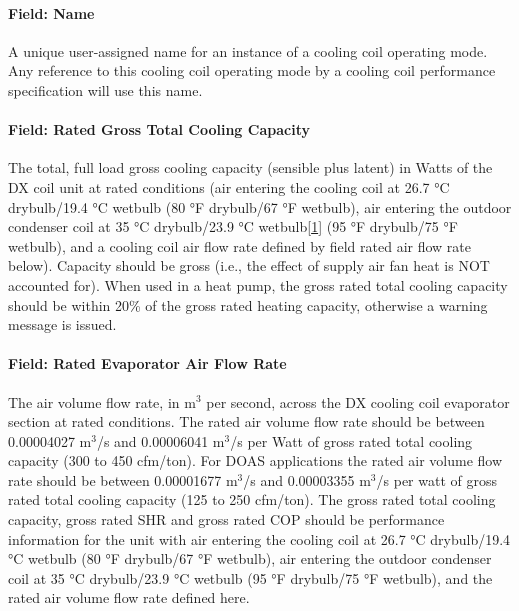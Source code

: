 \paragraph{Field: Name}\label{field-name-03}

A unique user-assigned name for an instance of a cooling coil operating mode. Any reference to this cooling coil operating mode by a cooling coil performance specification will use this name.

\paragraph{Field: Rated Gross Total Cooling Capacity}\label{field-rated-gross-total-cooling-capacity-1}

The total, full load gross cooling capacity (sensible plus latent) in Watts of the DX coil unit at rated conditions (air entering the cooling coil at 26.7 °C drybulb/19.4 °C wetbulb (80 °F drybulb/67 °F wetbulb), air entering the outdoor condenser coil at 35 °C drybulb/23.9 °C wetbulb\protect\hyperlink{ux5fftn1}{{[}1{]}} (95 °F drybulb/75 °F wetbulb), and a cooling coil air flow rate defined by field rated air flow rate below). Capacity should be gross (i.e., the effect of supply air fan heat is NOT accounted for). When used in a heat pump, the gross rated total cooling capacity should be within 20\% of the gross rated heating capacity, otherwise a warning message is issued.

\paragraph{Field: Rated Evaporator Air Flow Rate}\label{field-rated-evaporator-air-flow-rate-2}

The air volume flow rate, in m\(^{3}\) per second, across the DX cooling coil evaporator section at rated conditions. The rated air volume flow rate should be between 0.00004027 m\(^{3}\)/s and 0.00006041 m\(^{3}\)/s per Watt of gross rated total cooling capacity (300 to 450 cfm/ton). For DOAS applications the rated air volume flow rate should be between 0.00001677 m\(^{3}\)/s and 0.00003355 m\(^{3}\)/s per watt of gross rated total cooling capacity (125 to 250 cfm/ton). The gross rated total cooling capacity, gross rated SHR and gross rated COP should be performance information for the unit with air entering the cooling coil at 26.7 °C drybulb/19.4 °C wetbulb (80 °F drybulb/67 °F wetbulb), air entering the outdoor condenser coil at 35 °C drybulb/23.9 °C wetbulb (95 °F drybulb/75 °F wetbulb), and the rated air volume flow rate defined here.


